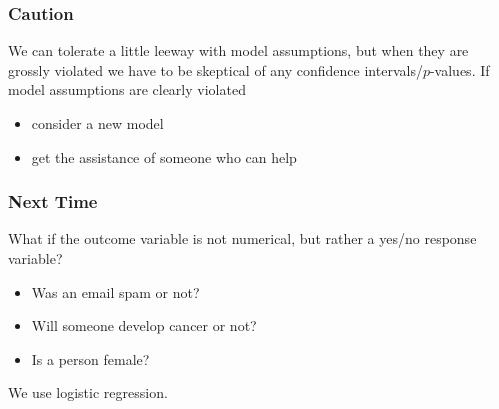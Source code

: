 \documentclass[handout]{beamer}
\newcommand{\blue}[1]{\textcolor{blue2}{#1}}
\begin{document}
\begin{frame}[fragile]
\frametitle{Caution}

We can tolerate a little leeway with model assumptions, but when they are grossly violated we have to be skeptical of any confidence intervals/$p$-values.  If model assumptions are clearly violated
\pause
\begin{itemize}
\item consider a new model
\item get the assistance of someone who can help
\end{itemize}

\end{frame}


\begin{frame}[fragile]
\frametitle{Next Time}

What if the outcome variable is not numerical, but rather a \blue{yes/no} response variable?

\pause \begin{itemize}
\item Was an email spam or not?
\item Will someone develop cancer or not?
\item Is a person female?
\end{itemize}

\pause We use \blue{logistic regression}.  

\end{frame}
\end{document}
